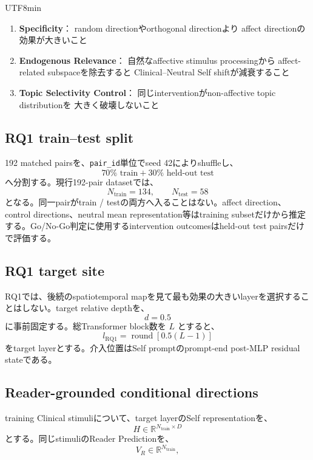 \documentclass{article} %
\begin{document}
\begin{CJK*}{UTF8}{min}
\begin{enumerate}
    \item \textbf{Specificity}：
    random directionやorthogonal directionより
    affect directionの効果が大きいこと

    \item \textbf{Endogenous Relevance}：
    自然なaffective stimulus processingから
    affect-related subspaceを除去すると
    Clinical--Neutral Self shiftが減衰すること

    \item \textbf{Topic Selectivity Control}：
    同じinterventionがnon-affective topic distributionを
    大きく破壊しないこと
\end{enumerate}


\subsection{RQ1 train--test split}

192 matched pairsを、\texttt{pair\_id}単位でseed 42によりshuffleし、
\[
70\%\text{ train}
+
30\%\text{ held-out test}
\]
へ分割する。現行192-pair datasetでは、
\[
N_{\mathrm{train}}=134,
\qquad
N_{\mathrm{test}}=58
\]
となる。同一pairがtrain / testの両方へ入ることはない。affect direction、control directions、neutral mean representation等はtraining subsetだけから推定する。Go/No-Go判定に使用するintervention outcomesはheld-out test pairsだけで評価する。


\subsection{RQ1 target site}

RQ1では、後続のspatiotemporal mapを見て最も効果の大きいlayerを選択することはしない。target relative depthを、
\[
d=0.5
\]
に事前固定する。総Transformer block数を \(L\) とすると、
\[
l_{\mathrm{RQ1}}
=
\operatorname{round}
[
0.5(L-1)
]
\]
をtarget layerとする。介入位置はSelf promptのprompt-end post-MLP residual stateである。


\subsection{Reader-grounded conditional directions}

training Clinical stimuliについて、target layerのSelf representationを、
\[
H
\in
\mathbb{R}^{N_{\mathrm{train}}\times D}
\]
とする。同じstimuliのReader Predictionを、
\[
V_R
\in
\mathbb{R}^{N_{\mathrm{train}}},
\]


\end{CJK*}
\end{document}
